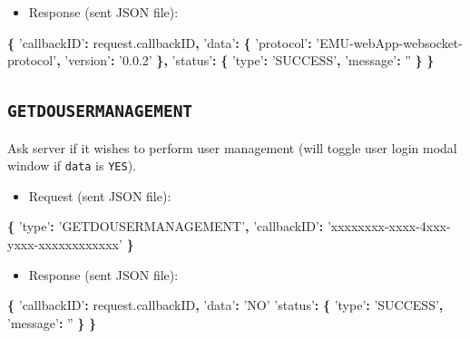 \documentclass[]{book}
\newenvironment{Shaded}{\begin{snugshade}}{\end{snugshade}}
\newcommand{\AttributeTok}[1]{\textcolor[rgb]{0.77,0.63,0.00}{#1}}
\newcommand{\NormalTok}[1]{#1}
\newcommand{\OperatorTok}[1]{\textcolor[rgb]{0.81,0.36,0.00}{\textbf{#1}}}
\newcommand{\StringTok}[1]{\textcolor[rgb]{0.31,0.60,0.02}{#1}}
\newcommand{\VariableTok}[1]{\textcolor[rgb]{0.00,0.00,0.00}{#1}}
\providecommand{\tightlist}{%
  \setlength{\itemsep}{0pt}\setlength{\parskip}{0pt}}
\theoremstyle{definition}
\theoremstyle{definition}
\theoremstyle{definition}
\theoremstyle{remark}
\begin{document}
\begin{itemize}
\tightlist
\item
  Response (sent JSON file):
\end{itemize}

\begin{Shaded}
\begin{Highlighting}[]
\OperatorTok{\{}
  \StringTok{'callbackID'}\OperatorTok{:} \VariableTok{request}\NormalTok{.}\AttributeTok{callbackID}\OperatorTok{,}
  \StringTok{'data'}\OperatorTok{:} \OperatorTok{\{}
    \StringTok{'protocol'}\OperatorTok{:} \StringTok{'EMU-webApp-websocket-protocol'}\OperatorTok{,}
    \StringTok{'version'}\OperatorTok{:} \StringTok{'0.0.2'}
  \OperatorTok{\},}
  \StringTok{'status'}\OperatorTok{:} \OperatorTok{\{}
    \StringTok{'type'}\OperatorTok{:} \StringTok{'SUCCESS'}\OperatorTok{,}
    \StringTok{'message'}\OperatorTok{:} \StringTok{''}
  \OperatorTok{\}}
\OperatorTok{\}}
\end{Highlighting}
\end{Shaded}

\hypertarget{getdousermanagement}{%
\subsection{\texorpdfstring{\texttt{GETDOUSERMANAGEMENT}}{GETDOUSERMANAGEMENT}}\label{getdousermanagement}}

Ask server if it wishes to perform user management (will toggle user
login modal window if \texttt{data} is \texttt{YES}).

\begin{itemize}
\tightlist
\item
  Request (sent JSON file):
\end{itemize}

\begin{Shaded}
\begin{Highlighting}[]
\OperatorTok{\{}
  \StringTok{'type'}\OperatorTok{:} \StringTok{'GETDOUSERMANAGEMENT'}\OperatorTok{,}
  \StringTok{'callbackID'}\OperatorTok{:} \StringTok{'xxxxxxxx-xxxx-4xxx-yxxx-xxxxxxxxxxxx'}
\OperatorTok{\}}
\end{Highlighting}
\end{Shaded}

\begin{itemize}
\tightlist
\item
  Response (sent JSON file):
\end{itemize}

\begin{Shaded}
\begin{Highlighting}[]
\OperatorTok{\{}
  \StringTok{'callbackID'}\OperatorTok{:} \VariableTok{request}\NormalTok{.}\AttributeTok{callbackID}\OperatorTok{,}
  \StringTok{'data'}\OperatorTok{:} \StringTok{'NO'}
  \StringTok{'status'}\OperatorTok{:} \OperatorTok{\{}
    \StringTok{'type'}\OperatorTok{:} \StringTok{'SUCCESS'}\OperatorTok{,}
    \StringTok{'message'}\OperatorTok{:} \StringTok{''}
  \OperatorTok{\}}
\OperatorTok{\}}
\end{Highlighting}
\end{Shaded}
\end{document}
